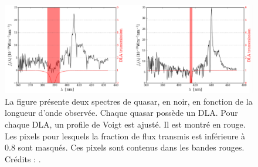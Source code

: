 \begin{figure}
  \centering
  \includegraphics[scale=0.4]{exemple_dla}
  \caption{La figure présente deux spectres de quasar, en noir, en fonction de la longueur d'onde observée. Chaque quasar possède un DLA. Pour chaque DLA, un profile de Voigt est ajusté. Il est montré en rouge. Les pixels pour lesquels la fraction de flux transmis est inférieure à \num{0.8} sont masqués. Ces pixels sont contenus dans les bandes rouges. Crédits : \textcite{DeSainteAgathe}.}
  \label{fig:exemple_dla}
\end{figure}




% 
